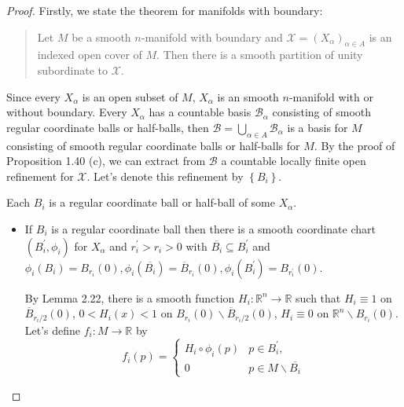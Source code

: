 \begin{proof}
    Firstly, we state the theorem for manifolds with boundary:
    \begin{quotation}
        Let \( M \) be a smooth \(n\)-manifold with boundary and \( \mathcal{X} = {(X_{\alpha})}_{\alpha \in A} \) is an indexed open cover of \( M \). Then there is a smooth partition of unity subordinate to \( \mathcal{X} \).
    \end{quotation}

    Since every \( X_{\alpha} \) is an open subset of \( M \), \( X_{\alpha} \) is an smooth \(n\)-manifold with or without boundary. Every \( X_{\alpha} \) has a countable basis \( \mathcal{B}_{\alpha} \) consisting of smooth regular coordinate balls or half-balls, then \( \mathcal{B} = \bigcup_{\alpha \in A} \mathcal{B}_{\alpha} \) is a basis for \( M \) consisting of smooth regular coordinate balls or half-balls for \( M \). By the proof of Proposition 1.40 (c), we can extract from \( \mathcal{B} \) a countable locally finite open refinement for \( \mathcal{X} \). Let's denote this refinement by \( \left\{ B_{i} \right\} \).

    Each \( B_{i} \) is a regular coordinate ball or half-ball of some \( X_{\alpha} \).
    \begin{itemize}
        \item If \( B_{i} \) is a regular coordinate ball then there is a smooth coordinate chart \( (B_{i}^{\prime}, \phi_{i}) \) for \( X_{\alpha} \) and \( r_{i}^{\prime} > r_{i} > 0 \) with \( \overline{B_{i}} \subseteq B_{i}^{\prime} \) and \( \phi_{i}(B_{i}) = B_{r_{i}}(0), \phi_{i}(\overline{B_{i}}) = \overline{B}_{r_{i}}(0), \phi_{i}(B_{i}^{\prime}) = B_{r_{i}^{\prime}}(0) \).


              By Lemma 2.22, there is a smooth function \( H_{i}: \mathbb{R}^{n} \to \mathbb{R} \) such that \( H_{i} \equiv 1 \) on \( \overline{B}_{r_{i}/2}(0) \), \( 0 < H_{i}(x) < 1 \) on \( B_{r_{i}}(0) \smallsetminus \overline{B}_{r_{i}/2}(0) \), \( H_{i} \equiv 0 \) on \( \mathbb{R}^{n} \smallsetminus B_{r_{i}}(0) \). Let's define \( f_{i}: M \to \mathbb{R} \) by
              \[
                  f_{i}(p) = \begin{cases}
                      H_{i} \circ \phi_{i}(p) & p \in B_{i}^{\prime},                   \\
                      0                       & p \in M \smallsetminus \overline{B_{i}}
                  \end{cases}
              \]


\end{itemize}
\end{proof}
